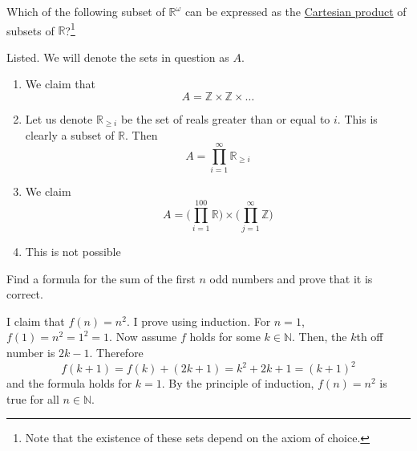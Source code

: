   \begin{exercise} 
    Which of the following subset of $\mathbb{R}^\omega$ can be expressed as the \hyperref[def:cart-prod-2]{Cartesian product} of subsets of $\mathbb{R}$?\footnote{Note that the existence of these sets depend on the axiom of choice.}
  \end{exercise}
  \begin{solution}
    Listed. We will denote the sets in question as $A$. 
    \begin{enumerate}
      \item We claim that 
        \begin{equation}
          A = \mathbb{Z} \times \mathbb{Z} \times \ldots
        \end{equation}
      \item Let us denote $\mathbb{R}_{\geq i}$ be the set of reals greater than or equal to $i$. This is clearly a subset of $\mathbb{R}$. Then 
        \begin{equation}
          A = \prod_{i=1}^\infty \mathbb{R}_{\geq i}
        \end{equation}
      \item We claim 
        \begin{equation}
          A = \bigg( \prod_{i=1}^{100} \mathbb{R} \bigg) \times \bigg( \prod_{j=1}^\infty \mathbb{Z} \bigg)
        \end{equation}
      \item This is not possible
    \end{enumerate}
  \end{solution}

  \begin{exercise}
    Find a formula for the sum of the first $n$ odd numbers and prove that it is correct.
  \end{exercise}
  \begin{solution}
    I claim that $f(n) = n^2$. I prove using induction. For $n = 1$, $f(1) = n^2 = 1^2 = 1$. Now assume $f$ holds for some $k \in \mathbb{N}$. Then, the $k$th off number is $2k-1$. Therefore 
    \begin{equation}
      f(k+1) = f(k) + (2k + 1) = k^2 + 2k + 1 = (k + 1)^2
    \end{equation}
    and the formula holds for $k=1$. By the principle of induction, $f(n) = n^2$ is true for all $n \in \mathbb{N}$. 
  \end{solution}

